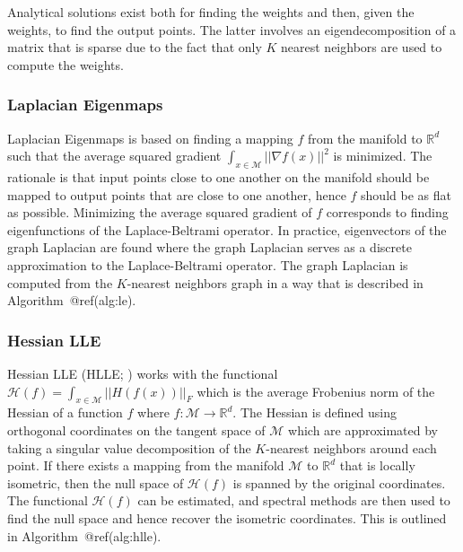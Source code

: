 \documentclass{article}
\begin{document}
Analytical solutions exist both for finding the weights and then, given
the weights, to find the output points. The latter involves an
eigendecomposition of a matrix that is sparse due to the fact that only
\(K\) nearest neighbors are used to compute the weights.

\hypertarget{laplacian-eigenmaps}{%
\subsubsection*{Laplacian Eigenmaps}\label{laplacian-eigenmaps}}

Laplacian Eigenmaps \citep{Belkin2003-kz} is based on finding a mapping
\(f\) from the manifold to \(\mathbb{R}^d\) such that the average
squared gradient \(\int_{x\in\mathcal{M}}||\nabla f(x)||^2\) is
minimized. The rationale is that input points close to one another on
the manifold should be mapped to output points that are close to one
another, hence \(f\) should be as flat as possible. Minimizing the
average squared gradient of \(f\) corresponds to finding eigenfunctions
of the Laplace-Beltrami operator. In practice, eigenvectors of the graph
Laplacian are found where the graph Laplacian serves as a discrete
approximation to the Laplace-Beltrami operator. The graph Laplacian is
computed from the \(K\)-nearest neighbors graph in a way that is
described in Algorithm~@ref(alg:le).

\hypertarget{hessian-lle}{%
\subsubsection*{Hessian LLE}\label{hessian-lle}}

Hessian LLE (HLLE; \citet{Donoho2003-am}) works with the functional
\(\mathcal{H}(f)=\int_{x\in\mathcal{M}}||H(f(x))||_F\) which is the
average Frobenius norm of the Hessian of a function \(f\) where
\(f:\mathcal{M}\rightarrow\mathbb{R}^d\). The Hessian is defined using
orthogonal coordinates on the tangent space of \(\mathcal{M}\) which are
approximated by taking a singular value decomposition of the
\(K\)-nearest neighbors around each point. If there exists a mapping
from the manifold \(\mathcal{M}\) to \(\mathbb{R}^d\) that is locally
isometric, then the null space of \(\mathcal{H}(f)\) is spanned by the
original coordinates. The functional \(\mathcal{H}(f)\) can be
estimated, and spectral methods are then used to find the null space and
hence recover the isometric coordinates. This is outlined in
Algorithm~@ref(alg:hlle).
\end{document}
